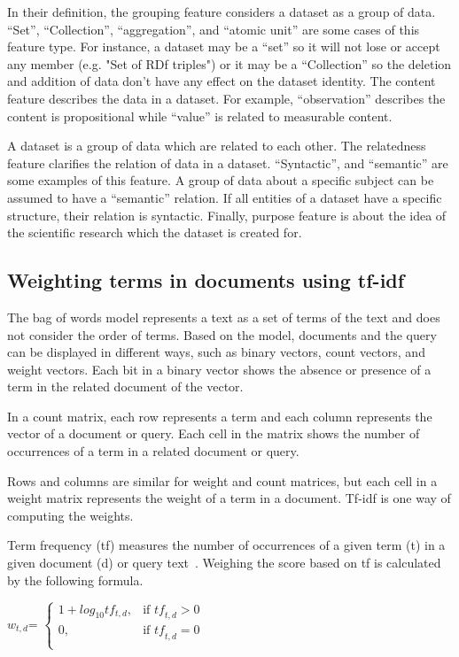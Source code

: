 \documentclass{IOS-Book-Article}
\begin{document}
In their definition, the grouping feature considers a dataset as a group of data.  \enquote{Set}, \enquote{Collection}, \enquote{aggregation}, and \enquote{atomic unit} are some cases of this feature type. For instance, a dataset may be a \enquote{set} so it will not lose or accept any member (e.g. "Set of RDf triples")\cite{renear2010definitions} or it may be a \enquote{Collection} so the deletion and addition of data don't have any effect on the dataset identity. The content feature describes the data in a dataset. For example, \enquote{observation} describes the content is propositional while \enquote{value} is related to measurable content.

A dataset is a group of data which are related to each other. The relatedness feature clarifies the relation of data in a dataset. \enquote{Syntactic}, and \enquote{semantic} are some examples of this feature.   
A group of data about a specific subject can be assumed to have a \enquote{semantic} relation.
If all entities of a dataset have a specific structure, their relation is syntactic.
Finally, purpose feature is about the idea of the scientific research which the dataset is created for.

\subsection{Weighting terms in documents using tf-idf}
\label{sec:tfidf}
The bag of words model represents a text as a set of terms of the text and does not consider the order of terms. Based on the model, documents and the query can be displayed in different ways, such as binary vectors, count vectors, and weight vectors. Each bit in a binary vector shows the absence or presence of a term in the related document of the vector.

In a count matrix, each row represents a term and each column represents the vector of a document or query. Each cell in the matrix shows the number of occurrences of a term in a related document or query. 

Rows and columns are similar for weight and count matrices, but each cell in a weight matrix represents the weight of a term in a document. Tf-idf is one way of computing the weights.

Term frequency (tf) measures the number of occurrences of a given term (t) in a given document (d) or query text~\citep{SALTON1988}. 
Weighing the score based on tf is calculated by the following formula. 
\begin{center} 
	$w_{t,d}$=
	$\begin{cases}
	1+log_{10} tf_{t,d}, & \text{if $\mathit{tf}_{t,d}>0$} \\
	0, & \text{if $\mathit{tf}_{t,d}=0$}\\
	\end{cases}$
\end{center}
\end{document}
